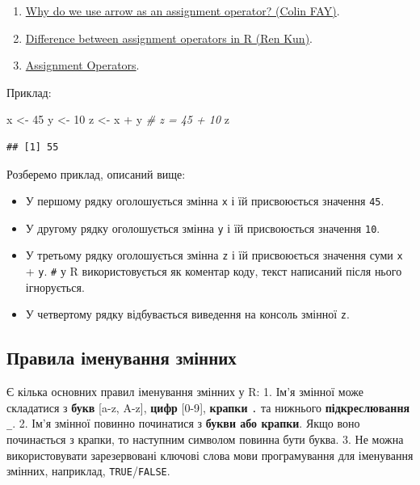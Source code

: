 \documentclass[
]{book}
\newenvironment{Shaded}{\begin{snugshade}}{\end{snugshade}}
\newcommand{\CommentTok}[1]{\textcolor[rgb]{0.56,0.35,0.01}{\textit{#1}}}
\newcommand{\DecValTok}[1]{\textcolor[rgb]{0.00,0.00,0.81}{#1}}
\newcommand{\NormalTok}[1]{#1}
\newcommand{\OtherTok}[1]{\textcolor[rgb]{0.56,0.35,0.01}{#1}}
\newcommand{\SpecialCharTok}[1]{\textcolor[rgb]{0.00,0.00,0.00}{#1}}
\providecommand{\tightlist}{%
  \setlength{\itemsep}{0pt}\setlength{\parskip}{0pt}}
\begin{document}
\begin{enumerate}
\def\labelenumi{\arabic{enumi}.}
\tightlist
\item
  \href{https://colinfay.me/r-assignment/}{Why do we use arrow as an assignment operator? (Colin FAY)}.
\item
  \href{https://renkun.me/2014/01/28/difference-between-assignment-operators-in-r/}{Difference between assignment operators in R (Ren Kun)}.
\item
  \href{https://stat.ethz.ch/R-manual/R-devel/library/base/html/assignOps.html}{Assignment Operators}.
\end{enumerate}

Приклад:

\begin{Shaded}
\begin{Highlighting}[]
\NormalTok{x }\OtherTok{\textless{}{-}} \DecValTok{45}
\NormalTok{y }\OtherTok{\textless{}{-}} \DecValTok{10}
\NormalTok{z }\OtherTok{\textless{}{-}}\NormalTok{ x }\SpecialCharTok{+}\NormalTok{ y }\CommentTok{\# z = 45 + 10}
\NormalTok{z}
\end{Highlighting}
\end{Shaded}

\begin{verbatim}
## [1] 55
\end{verbatim}

Розберемо приклад, описаний вище:

\begin{itemize}
\tightlist
\item
  У першому рядку оголошується змінна \texttt{x} і їй присвоюється значення \texttt{45}.
\item
  У другому рядку оголошується змінна \texttt{y} і їй присвоюється значення \texttt{10}.
\item
  У третьому рядку оголошується змінна \texttt{z} і їй присвоюється значення суми \texttt{x} + \texttt{y}.
  \texttt{\#} у R використовується як коментар коду, текст написаний після нього ігнорується.
\item
  У четвертому рядку відбувається виведення на консоль змінної \texttt{z}.
\end{itemize}

\hypertarget{chapter212}{%
\subsection{Правила іменування змінних}\label{chapter212}}

Є кілька основних правил іменування змінних у R:
1. Ім'я змінної може складатися з \textbf{букв} {[}a-z, A-z{]}, \textbf{цифр} {[}0-9{]}, \textbf{крапки} \texttt{.} та нижнього \textbf{підкреслювання} \texttt{\_}.
2. Ім'я змінної повинно починатися з \textbf{букви або крапки}. Якщо воно починається з крапки, то наступним символом повинна бути буква.
3. Не можна використовувати зарезервовані ключові слова мови програмування для іменування змінних, наприклад, \texttt{TRUE}/\texttt{FALSE}.
\end{document}
